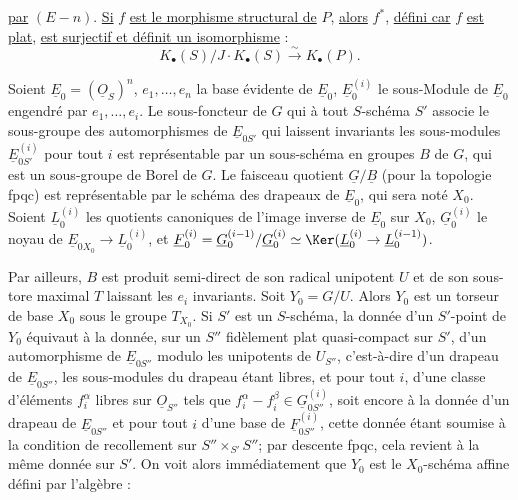 
\uline{par} $(E-n)$. \uline{Si} $f$ \uline{est le morphisme structural de} $P$, \uline{alors} $f^*$, \uline{défini car} $f$ \uline{est plat}, \uline{est surjectif et définit un isomorphisme} :
\[
K_\bullet(S)/J\cdot K_\bullet(S)\xrightarrow{\sim}K_\bullet(P).
\]

Soient $\underline{E}_0=(\underline{O}_S)^n$, $e_1,\ldots,e_n$ la base évidente de $\underline{E}_0$, $\underline{E}_0^{(i)}$ le sous-Module de $\underline{E}_0$ engendré par $e_1,\ldots,e_i$. Le sous-foncteur de $G$ qui à tout $S$-schéma $S'$ associe le sous-groupe des automorphismes de $\underline{E}_{0S'}$ qui laissent invariants les sous-modules $\underline{E}_{0S'}^{(i)}$ pour tout $i$ est représentable par un sous-schéma en groupes $B$ de $G$, qui est un sous-groupe de Borel de $G$. Le faisceau quotient $\underline{G}/\underline{B}$ (pour la topologie fpqc) est représentable par le schéma des drapeaux de $\underline{E}_0$, qui sera noté $X_0$. Soient $\underline{L}_0^{(i)}$ les quotients canoniques de l'image inverse de $\underline{E}_0$ sur $X_0$, $\underline{G}_0^{(i)}$ le noyau de $\underline{E}_{0X_0}\to \underline{L}_0^{(i)}$, et $\underline{F}_0^{(i)}=\underline{G}_0^{(i-1)}/\underline{G}_0^{(i)}\simeq \Ker(\underline{L}_0^{(i)}\to \underline{L}_0^{(i-1)})$.

Par ailleurs, $B$ est produit semi-direct de son radical unipotent $U$ et de son sous-tore maximal $T$ laissant les $e_i$ invariants. Soit $Y_0=G/U$. Alors $Y_0$ est un torseur de base $X_0$ sous le groupe $T_{X_0}$. Si $S'$ est un $S$-schéma, la donnée d'un $S'$-point de $Y_0$ équivaut à la donnée, sur un $S''$ fidèlement plat quasi-compact sur $S'$, d'un automorphisme de $\underline{E}_{0S''}$ modulo les unipotents de $U_{S''}$, c'est-à-dire d'un drapeau de $\underline{E}_{0S''}$, les sous-modules du drapeau étant libres, et pour tout $i$, d'une classe d'éléments $f_i^\alpha$ libres sur $\underline{O}_{S''}$ tels que $f_i^\alpha-f_i^\beta\in \underline{G}_{0S''}^{(i)}$, soit encore à la donnée d'un drapeau de $\underline{E}_{0S''}$ et pour tout $i$ d'une base de $\underline{F}_{0S''}^{(i)}$, cette donnée étant soumise à la condition de recollement sur $S''\times_{S'}S''$; par descente fpqc, cela revient à la même donnée sur $S'$. On voit alors immédiatement que $Y_0$ est le $X_0$-schéma affine défini par l'algèbre :
